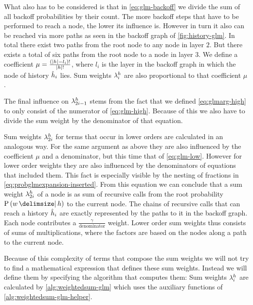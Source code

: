What also has to be considered is that in \cref{eq:glm-backoff} we divide the
sum of all backoff probabilities by their count.
The more backoff steps that have to be performed to reach a node, the lower its
influence is.
However in turn it also can be reached via more paths as seen in the backoff
graph of \cref{fig:history-glm}.
In total there exist two paths from the root node to any node in layer $2$.
But there exists a total of six paths from the root node to a node in layer
$3$.
We define a coefficient $\mu = \frac{({\left|h\right|} - l_i)!}{{\left|h\right|}!}$,
where $l_i$ is the layer in the backoff graph in which the node of history
$\DerivedHistory[i]$ lies.
Sum weights $\lambda^h_i$ are also proportional to that coefficient $\mu$.

The final influence on $\lambda^h_{2 i - 1}$ stems from the fact that we
defined \cref{eq:glmarg-high} to only consist of the numerator of
\cref{eq:glm-high}.
Because of this we also have to divide the sum weight by the denominator of
that equation.

Sum weights $\lambda^h_{2 i}$ for terms that occur in lower orders are
calculated in an analogous way.
For the same argument as above they are also influenced by the coefficient
$\mu$ and a denominator, but this time that of \cref{eq:glm-low}.
However for lower order weights they are also influenced by the denominators
of equations that included them.
This fact is especially visible by the nesting of fractions in
\cref{eq:probglmexpansion-inserted}.
From this equation we can conclude that a sum weight $\lambda^h_{2 i}$ of a
node is as sum of recursive calls from the root probability $\Prob{w}{h}$ to
the current node.
The chains of recursive calls that can reach a history $\DerivedHistory[i]$ are
exactly represented by the paths to it in the backoff graph.
Each node contributes a $\frac{\gamma}{\text{denominator}}$ weight.
Lower order sum weights thus consists of sums of multiplications, where the
factors are based on the nodes along a path to the current node.

Because of this complexity of terms that compose the sum weights we will not try
to find a mathematical expression that defines these sum weights.
Instead we will define them by specifying the algorithm that computes them:
Sum weights $\lambda^h_i$ are calculated by \cref{alg:weightedsum-glm} which
uses the auxiliary functions of \cref{alg:weightedsum-glm-helper}.


